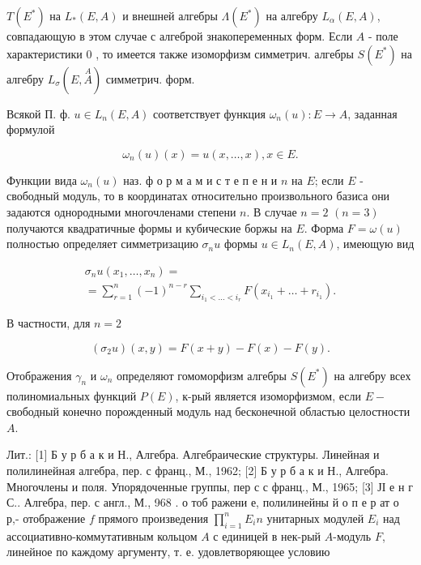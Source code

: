 \documentclass[10pt]{article}
\begin{document}
$T\left(E^{*}\right)$ на $L_{*}(E, A)$ и внешней алгебры $\Lambda\left(E^{*}\right)$ на алгебру $L_{\alpha}(E, A)$, совпадающую в этом случае с алгеброй знакопеременных форм. Если $A$ - поле характеристики 0 , то имеется также изоморфизм симметрич. алгебры $S\left(E^{*}\right)$ на алгебру $L_{\sigma}(E, \stackrel{A}{A})$ симметрич. форм.



Всякой П. ф. $u \in L_{n}(E, A)$ соответствует функция $\omega_{n}(u): E \rightarrow A$, заданная формулой



\[

\omega_{n}(u)(x)=u(x, \ldots, x), x \in E .

\]



Функции вида $\omega_{n}(u)$ наз. ф о р м а м и с т е п е н и $n$ на $E$; если $E$ - свободный модуль, то в координатах относительно произвольного базиса они задаются однородными многочленами степени $n$. В случае $n=2$ $(n=3)$ получаются квадратичные формы и кубические боржы на $E$. Форма $F=\omega(u)$ полностью определяет симметризацию $\sigma_{n} u$ формы $u \in L_{n}(E, A)$, имеющую вид



\[

\begin{gathered}

\sigma_{n} u\left(x_{1}, \ldots, x_{n}\right)= \\

=\sum_{r=1}^{n}(-1)^{n-r} \sum_{i_{1}<\ldots<i_{r}} F\left(x_{i_{1}}+\ldots+r_{i_{1}}\right) .

\end{gathered}

\]



В частности, для $n=2$



\[

\left(\sigma_{2} u\right)(x, y)=F(x+y)-F(x)-F(y) .

\]



Отображения $\gamma_{n}$ и $\omega_{n}$ определяют гомоморфизм алгебры $S\left(E^{*}\right)$ на алгебру всех полиномиальных функций $P(E)$, к-рый является изоморфизмом, если $E-$ свободный конечно порожденный модуль над бесконечной областью целостности $A$.



Лит.: [1] Б у р б а к и Н., Алгебра. Алгебраические структуры. Линейная и полилинейная алгебра, пер. с франц., М., 1962; [2] Б у р б а к и Н., Алгебра. Многочлены и поля. Упорядоченные группы, пер с с франц., М., 1965; [3] ЈІ е н г С.. Алгебра, пер. с англ., М., 968 . о тоб ражени е, полилинейны й о п е р ат о р,- отображение $f$ прямого произведения $\prod_{i=1}^{n} E_{i} n$ унитарных модулей $E_{i}$ над ассоциативно-коммутативным кольцом $A$ с единицей в нек-рый $A$-модуль $F$, линейное по каждому аргументу, т. е. удовлетворяющее условию
\end{document}
